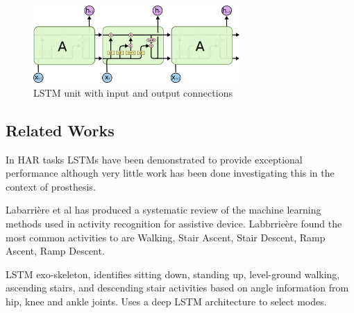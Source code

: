 \documentclass[sensors,article,submit,moreauthors,pdftex]{Definitions/mdpi}
\begin{document}
\begin{figure}[!htb]
    \centering
    \includegraphics[width=0.7\textwidth]{Figures/lstm/LSTM-chain.png}
    \caption{LSTM unit with input and output connections \cite{Olah2015}}
    \label{fig:lstm_unit}
\end{figure}



\subsection{Related Works}
In HAR tasks LSTMs have been demonstrated to provide exceptional performance\cite{Murad2017} although very little work has been done investigating this in the context of prosthesis\cite{Fluit2020}.

Labarri\`ere et al has produced a systematic review of the machine learning methods used in activity recognition for assistive device\cite{Labarriere2020}. Labbrrie\`ere found the most common activities to are Walking, Stair Ascent, Stair Descent, Ramp Ascent, Ramp Descent.

LSTM exo-skeleton\cite{Wang2018}, identifies sitting down, standing up, level-ground walking, ascending stairs, and descending stair activities based on angle information from hip, knee and ankle joints. Uses a deep LSTM architecture to select modes.


\end{document}
